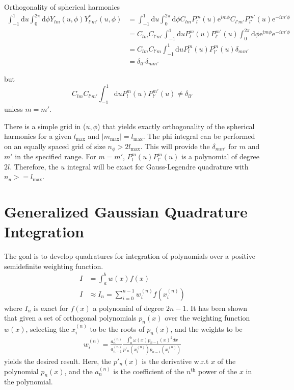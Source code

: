 \documentclass[paper=a4, fontsize=11pt]{article} %
\numberwithin{equation}{section} %
\numberwithin{figure}{section} %
\numberwithin{table}{section} %
\newcommand{\re}{{\mathrm{e}}}
\newcommand{\rd}{{\mathrm{d}}}
\begin{document}
Orthogonality of spherical harmonics
\begin{equation}
\begin{split}
\int_{-1}^1 \rd u \int_{0}^{2\pi} \rd \phi Y_{lm}(u,\phi)Y_{l'm'}^*(u,\phi)
&= \int_{-1}^1 \rd u \int_{0}^{2\pi} \rd \phi C_{lm} P_l^m(u)\re^{im\phi}C_{l'm'} P_{l'}^{m'}(u)\re^{-im'\phi}\\
&= C_{lm}C_{l'm'} \int_{-1}^1 \rd u P_l^m(u) P_{l'}^{m'}(u) \int_{0}^{2\pi} \rd \phi\re^{im\phi}\re^{-im'\phi}\\
&= C_{lm}C_{l'm} \int_{-1}^1 \rd u P_l^m(u) P_{l'}^{m}(u)  \delta_{mm'}\\
&= \delta_{ll'}\delta_{mm'}
\end{split}
\end{equation}

but
\begin{equation}
C_{lm}C_{l'm'} \int_{-1}^1 \rd u P_l^m(u) P_{l'}^{m'}(u)
\neq \delta_{ll'}
\end{equation}
unless $m = m'$.

There is a simple grid in ($u, \phi$) that yields exactly orthogonality of the spherical harmonics for a given $l_{\mathrm{max}}$ and $|m_{\mathrm{max}}| = l_{\mathrm{max}}$. The phi integral can be performed on an equally spaced grid of size $n_{\phi} > 2l_{\mathrm{max}}$. This will provide the $\delta_{mm'}$ for $m$ and $m'$ in the specified range. For $m=m'$, $P_{l}^{m}(u)P_{l'}^{m}(u)$ is a polynomial of degree $2l$. Therefore, the $u$ integral will be exact for Gauss-Legendre quadrature with $n_u >= l_{\mathrm{max}}$. 

\newpage
\section{Generalized Gaussian Quadrature Integration}\label{App:GGI}
The goal is to develop quadratures for integration of polynomials over a positive semidefinite weighting function.
\begin{equation}
\begin{split}
I &= \int_{a}^{b}w(x) f(x) \\
I &\approx I_n = \sum_{i=0}^{n-1} w_i^{(n)} f(x_i^{(n)})
\end{split}
\end{equation}
where $I_n$ is exact for $f(x)$ a polynomial of degree $2n-1$. It has been shown that given a set of orthogonal polynomials $p_n(x)$ over the weighting function $w(x)$, selecting the $x_i^{(n)}$ to be the roots of $p_n(x)$, and the weights to be
\begin{equation}
\begin{split}
w_{i}^{(n)}={\frac {a_{n}^{(n)}}{a_{n-1}^{(n)}}}{\frac {\int _{a}^{b}\omega (x)p_{n-1}(x)^{2}dx}{p'_{n}(x_{i}^{(n)})p_{n-1}(x_{i}^{(n)})}}
\end{split}
\end{equation}
yields the desired result.
Here, the $p'_{n}(x)$ is the derivative w.r.t $x$ of the polynomial $p_n(x)$, and the $a_n^{(n)}$ is the coefficient of the $n^{\mathrm{th}}$ power of the $x$ in the polynomial.\\
\end{document}
